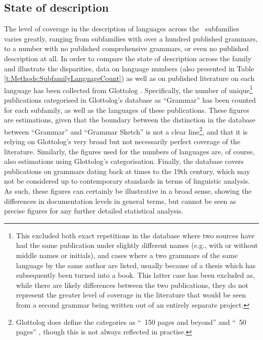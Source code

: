 \subsection{State of description}\label{ss:Description:StateOfDescription}
The level of coverage in the description of languages across the \lfam\ subfamilies varies greatly, ranging from subfamilies with over a hundred published grammars, to a number with no published comprehensive grammars, or even no published description at all. In order to compare the state of description across the family and illustrate the disparities, data on language numbers (also presented in Table \ref{t:Methods:SubfamilyLanguageCount}) as well as on published literature on each language has been collected from Glottolog \cite{glottolog}. Specifically, the number of unique\footnote{This excluded both exact repetitions in the database where two sources have had the same publication under slightly different names (e.g., with or without middle names or initials), and cases where a two grammars of the same language by the same author are listed, usually because of a thesis which has subsequently been turned into a book. This latter case has been excluded as, while there are likely differences between the two publications, they do not represent the greater level of coverage in the literature that would be seen from a second grammar being written out of an entirely separate project.} publications categorised in Glottolog's database as ``Grammar'' has been counted for each subfamily, as well as the languages of these publications. These figures are estimations, given that the boundary between the distinction in the database between ``Grammar'' and ``Grammar Sketch'' is not a clear line\footnote{Glottolog does define the categories as ``~150 pages and beyond'' and ``~50 pages'' \cite[Glossary]{glottolog}, though this is not always reflected in practise.}, and that it is relying on Glottolog's very broad but not necessarily perfect coverage of the literature. Similarly, the figures used for the numbers of languages are, of course, also estimations using Glottolog's categorisation. Finally, the database covers publications on grammars dating back at times to the 19th century, which may not be considered up to contemporary standards in terms of linguistic analysis. As such, these figures can certainly be illustrative in a broad sense, showing the differences in documentation levels in general terms, but cannot be seen as precise figures for any further detailed statistical analysis.

